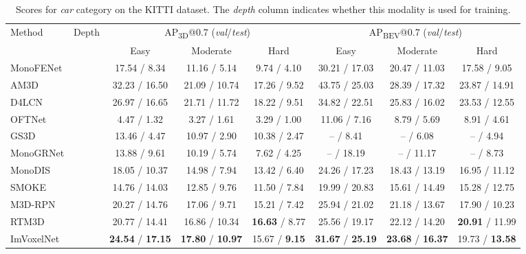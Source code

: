 \documentclass[10pt,twocolumn,letterpaper]{article}
\newcommand{\cmark}{\ding{51}}
\newcommand{\xmark}{\ding{55}}
\begin{document}
\begin{table*}[!h]
    \centering \small
    \begingroup \setlength{\tabcolsep}{2pt}
    \begin{tabular}{l|c|ccc|ccc}
    \hline
    \multirow[c]{2}{*}{Method} & \multirow[c]{2}{*}{Depth} & \multicolumn{3}{c|}{AP\textsubscript{3D}@0.7 (\emph{val}/\emph{test})} & \multicolumn{3}{c}{AP\textsubscript{BEV}@0.7 (\emph{val}/\emph{test})} \\
    & & Easy & Moderate & Hard & Easy & Moderate & Hard \\ \hline
    MonoFENet\cite{bao2019monofenet} & \cmark & 17.54 / \phantom{0}8.34 & 11.16 / \phantom{0}5.14 & \phantom{0}9.74 / 4.10 & 30.21 / 17.03 & 20.47 / 11.03 & 17.58 / \phantom{0}9.05 \\
    AM3D\cite{ma2019am3d} & \cmark & 32.23 / 16.50 & 21.09 / 10.74 & 17.26 / 9.52 & 43.75 / 25.03 & 28.39 / 17.32 & 23.87 / 14.91 \\
    D4LCN\cite{ding2020d4lcn} & \cmark & 26.97 / 16.65 & 21.71 / 11.72 & 18.22 / 9.51 & 34.82 / 22.51 & 25.83 / 16.02 & 23.53 / 12.55 \\ \hline
    OFTNet\cite{roddick2018orthographic} & \xmark & \phantom{0}4.47 / \phantom{0}1.32 & \phantom{0}3.27 / \phantom{0}1.61 & \phantom{0}3.29 / \phantom{0}1.00 & 11.06 / \phantom{0}7.16 & \phantom{0}8.79 / \phantom{0}5.69 &  \phantom{0}8.91 / \phantom{0}4.61 \\
    GS3D\cite{li2019gs3d} & \xmark & 13.46 / \phantom{0}4.47 & 10.97 / \phantom{0}2.90 & 10.38 / 2.47 &  \phantom{00.0}-- / \phantom{0}8.41 &  \phantom{00.0}-- / \phantom{0}6.08 &  \phantom{00.0}-- / \phantom{0}4.94 \\
MonoGRNet\cite{qin2019monogrnet} & \xmark & 13.88 / \phantom{0}9.61 & 10.19 / \phantom{0}5.74 & \phantom{0}7.62 / 4.25 & \phantom{00.0}-- / 18.19 & \phantom{00.0}-- / 11.17 & \phantom{00.0}-- / \phantom{0}8.73 \\
MonoDIS\cite{simonelli2020disentangling} & \xmark & 18.05 / 10.37 & 14.98 / \phantom{0}7.94 & 13.42 / 6.40 & 24.26 / 17.23 & 18.43 / 13.19 & 16.95 / 11.12 \\
SMOKE\cite{liu2020smoke} & \xmark & 14.76 / 14.03 & 12.85 / \phantom{0}9.76 & 11.50 / 7.84 & 19.99 / 20.83 & 15.61 / 14.49 & 15.28 / 12.75 \\
    M3D-RPN\cite{brazil2019m3drpn} & \xmark & 20.27 / 14.76 & 17.06 / \phantom{0}9.71 & 15.21 / 7.42 & 25.94 / 21.02 & 21.18 / 13.67 & 17.90 / 10.23 \\
    RTM3D\cite{li2020rtm3d} & \xmark & 20.77 / 14.41 & 16.86 / 10.34 & \textbf{16.63} / 8.77 & 25.56 / 19.17 & 22.12 / 14.20 & \textbf{20.91} / 11.99 \\
    ImVoxelNet & \xmark & \textbf{24.54} / \textbf{17.15} & \textbf{17.80} / \textbf{10.97} & 15.67 / \textbf{9.15} & \textbf{31.67} / \textbf{25.19} & \textbf{23.68} / \textbf{16.37} & 19.73 / \textbf{13.58} \\ \hline
    \end{tabular} \endgroup
    \caption{Scores for \textit{car} category on the KITTI dataset. The \textit{depth} column indicates whether this modality is used for training.}
    \label{tab:kitti}
\end{table*}
\end{document}
